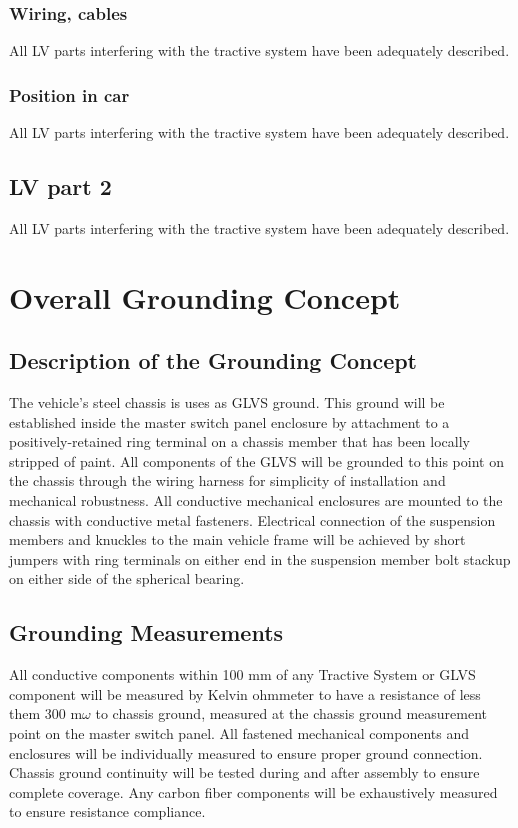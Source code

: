 \documentclass{article}
\begin{document}
\subsubsection*{Wiring, cables}
All LV parts interfering with the tractive system have been adequately described. 

\subsubsection{Position in car}
All LV parts interfering with the tractive system have been adequately described. 

\subsection{LV part 2}
All LV parts interfering with the tractive system have been adequately described. 

\section{Overall Grounding Concept}\label{overall_grounding_concept}
\subsection{Description of the Grounding Concept}
The vehicle's steel chassis is uses as GLVS ground. This ground will be established inside the master switch panel enclosure by attachment to a positively-retained ring terminal on a chassis member that has been locally stripped of paint. All components of the GLVS will be grounded to this point on the chassis through the wiring harness for simplicity of installation and mechanical robustness. All conductive mechanical enclosures are mounted to the chassis with conductive metal fasteners. Electrical connection of the suspension members and knuckles to the main vehicle frame will be achieved by short jumpers with ring terminals on either end in the suspension member bolt stackup on either side of the spherical bearing.


\subsection{Grounding Measurements}
All conductive components within 100 mm of any Tractive System or GLVS component will be measured by Kelvin ohmmeter to have a resistance of less them 300 m$\omega$ to chassis ground, measured at the chassis ground measurement point on the master switch panel. All fastened mechanical components and enclosures will be individually measured to ensure proper ground connection. Chassis ground continuity will be tested during and after assembly to ensure complete coverage. Any carbon fiber components will be exhaustively measured to ensure resistance compliance.
\end{document}
